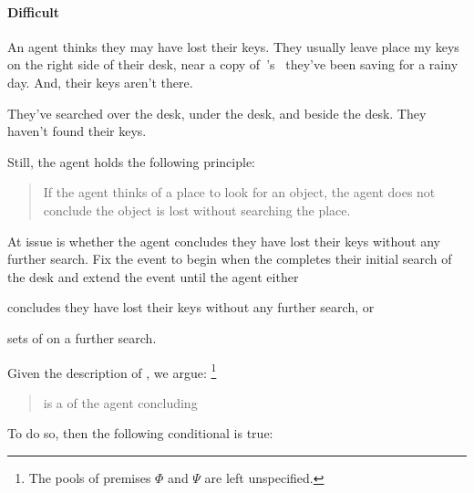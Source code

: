 \paragraph{Difficult}

\begin{note}
  \begin{scenario}%
    \label{illu:lost-key}%
    An agent thinks they may have lost their keys.
    They usually leave place my keys on the right side of their desk, near a copy of~\citeauthor{Vickers:1989tr}'s~ they've been saving for a rainy day.
    And, their keys aren't there.

    They've searched over the desk, under the desk, and beside the desk.
    They haven't found their keys.

    Still, the agent holds the following principle:
    \begin{quote}
      If the agent thinks of a place to look for an object, the agent does not conclude the object is lost without searching the place.
    \end{quote}

  \end{scenario}

  \noindent%
  At issue is whether the agent concludes they have lost their keys without any further search.
  Fix the event to begin when the \agents{} completes their initial search of the desk and extend the event until the agent either
  \begin{enumerate*}[label=(\alph*), ref=(\alph*)]
  \item
    concludes they have lost their keys without any further search, or
  \item
    sets of on a further search.
  \end{enumerate*}

  Given the description of \label{illu:lost-key}, we argue:%
  \footnote{
    The pools of premises \(\Phi\) and \(\Psi\) are left unspecified.
  }
  \begin{quote}
     is a \requ{} of the agent concluding 
  \end{quote}
  To do so, then the following conditional is true:


\end{note}
